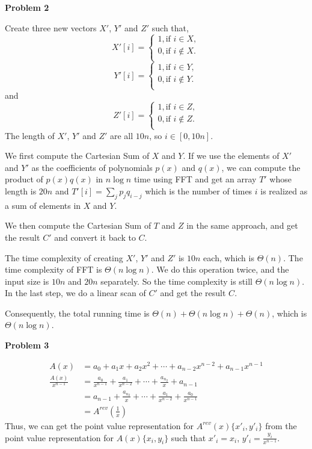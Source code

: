 \documentclass[12pt,letterpaper]{article}
\def\pp{\par\noindent}
\newcommand{\problem}[1]{ \bigskip \pp \textbf{Problem #1}\par}
\begin{document}
\problem{2}
Create three new vectors $X'$, $Y'$ and $Z'$ such that,
\[X'[i]=
\begin{cases}
	1, \text{if } i\in X,\\
	0, \text{if } i\notin X.\\
\end{cases}
\]
\[Y'[i]=
\begin{cases}
	1, \text{if } i\in Y,\\
	0, \text{if } i\notin Y.\\
\end{cases}
\]
and
\[Z'[i]=
\begin{cases}
	1, \text{if } i\in Z,\\
	0, \text{if } i\notin Z.\\
\end{cases}
\]
The length of $X'$, $Y'$ and $Z'$ are all $10n$, so $i\in [0, 10n]$.\par
We first compute the Cartesian Sum of $X$ and $Y$. If we use the elements of $X'$ and $Y'$ as the coefficients of polynomials $p(x)$ and $q(x)$, we can compute the product of $p(x)q(x)$ in $n\log n$ time using FFT and get an array $T'$ whose length is $20n$ and $T'[i]=\sum\limits_jp_jq_{i-j}$ which is the number of times $i$ is realized as a sum of elements in $X$ and $Y$.\par
We then compute the Cartesian Sum of $T$ and $Z$ in the same approach, and get the result $C'$ and convert it back to $C$.\par
The time complexity of creating $X'$, $Y'$ and $Z'$ is $10n$ each, which is $\Theta(n)$. The time complexity of FFT is $\Theta(n\log n)$. We do this operation twice, and the input size is $10n$ and $20n$ separately. So the time complexity is still $\Theta(n\log n)$. In the last step, we do a linear scan of $C'$ and get the result $C$.\par
Consequently, the total running time is $\Theta(n)+\Theta(n\log n)+\Theta(n)$, which is $\Theta(n\log n)$.

\problem{3}
\begin{align*}
	A(x)&=a_0+a_1x+a_2x^2+\cdots+a_{n-2}x^{n-2}+a_{n-1}x^{n-1}\\
	\frac{A(x)}{x^{n-1}}&=\frac{a_0}{x^{n-1}}+\frac{a_1}{x^{n-2}}+\cdots+\frac{a_{n_2}}{x}+a_{n-1}\\
	&=a_{n-1}+\frac{a_{n_2}}{x}+\cdots+\frac{a_1}{x^{n-2}}+\frac{a_0}{x^{n-1}}\\
	&=A^{rev}(\frac{1}{x})
\end{align*}
Thus, we can get the point value representation for $A^{rev}(x)\{x'_i, y'_i\}$ from the point value representation for $A(x)\{x_i, y_i\}$ such that $x'_i=x_i$, $y'_i=\frac{y_i}{x^{n-1}}$.
\end{document}
